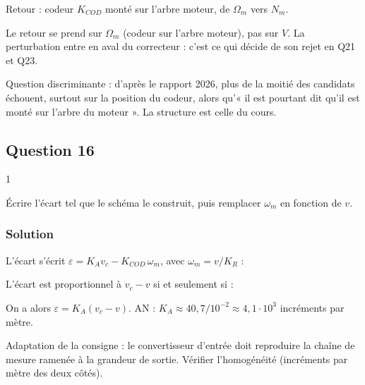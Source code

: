 \documentclass[11pt,a4paper]{article}
\newcommand{\equationajustee}[1]{%
  \sbox{\boiteequation}{$\displaystyle #1$}%
  \ifdim\wd\boiteequation>\linewidth
    \[\resizebox{\linewidth}{!}{\usebox{\boiteequation}}\]%
  \else
    \[#1\]%
  \fi}
\begin{document}
Retour : codeur \(K_{COD}\) monté sur l'arbre moteur, de \(\Omega_m\) vers \(N_m\).

\begin{piege}

Le retour se prend sur \(\Omega_m\) (codeur sur l'arbre moteur), pas sur \(V\). La perturbation entre en aval du correcteur : c'est ce qui décide de son rejet en Q21 et Q23.

\end{piege}

\begin{jury}

Question discriminante : d'après le rapport 2026, plus de la moitié des candidats échouent, surtout sur la position du codeur, alors qu'« il est pourtant dit qu'il est monté sur l'arbre du moteur ». La structure est celle du cours.

\end{jury}

\hypertarget{question-16}{%
\subsection{Question 16}\label{question-16}}

\begin{indication}{1}

Écrire l'écart tel que le schéma le construit, puis remplacer \(\omega_m\) en fonction de \(v\).

\end{indication}

\hypertarget{solution-15}{%
\subsubsection{Solution}\label{solution-15}}

L'écart s'écrit \(\varepsilon=K_Av_c-K_{COD}\,\omega_m\), avec \(\omega_m=v/K_R\) :

\equationajustee{\varepsilon=K_Av_c-\frac{K_{COD}}{K_R}\,v}

L'écart est proportionnel à \(v_c-v\) si et seulement si :

\equationajustee{\boxed{K_A=\frac{K_{COD}}{K_R}}}

On a alors \(\varepsilon=K_A(v_c-v)\). AN : \(K_A\approx40{,}7/10^{-2}\approx4{,}1\cdot10^3\) incréments par mètre.

\begin{methode}

Adaptation de la consigne : le convertisseur d'entrée doit reproduire la chaîne de mesure ramenée à la grandeur de sortie. Vérifier l'homogénéité (incréments par mètre des deux côtés).

\end{methode}
\end{document}
